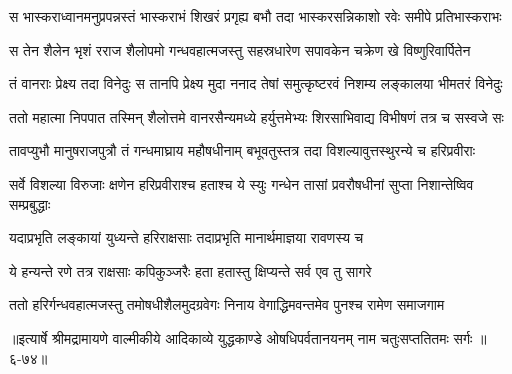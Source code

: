 \twolineshloka
{स भास्कराध्वानमनुप्रपन्नस्तं भास्कराभं शिखरं प्रगृह्य}
{बभौ तदा भास्करसन्निकाशो रवेः समीपे प्रतिभास्कराभः} %

\twolineshloka
{स तेन शैलेन भृशं रराज शैलोपमो गन्धवहात्मजस्तु}
{सहस्रधारेण सपावकेन चक्रेण खे विष्णुरिवार्पितेन} %

\twolineshloka
{तं वानराः प्रेक्ष्य तदा विनेदुः स तानपि प्रेक्ष्य मुदा ननाद}
{तेषां समुत्कृष्टरवं निशम्य लङ्कालया भीमतरं विनेदुः} %

\twolineshloka
{ततो महात्मा निपपात तस्मिन् शैलोत्तमे वानरसैन्यमध्ये}
{हर्युत्तमेभ्यः शिरसाभिवाद्य विभीषणं तत्र च सस्वजे सः} %

\twolineshloka
{तावप्युभौ मानुषराजपुत्रौ तं गन्धमाघ्राय महौषधीनाम्}
{बभूवतुस्तत्र तदा विशल्यावुत्तस्थुरन्ये च हरिप्रवीराः} %

\twolineshloka
{सर्वे विशल्या विरुजाः क्षणेन हरिप्रवीराश्च हताश्च ये स्युः}
{गन्धेन तासां प्रवरौषधीनां सुप्ता निशान्तेष्विव सम्प्रबुद्धाः} %

\twolineshloka
{यदाप्रभृति लङ्कायां युध्यन्ते हरिराक्षसाः}
{तदाप्रभृति मानार्थमाज्ञया रावणस्य च} %

\twolineshloka
{ये हन्यन्ते रणे तत्र राक्षसाः कपिकुञ्जरैः}
{हता हतास्तु क्षिप्यन्ते सर्व एव तु सागरे} %

\twolineshloka
{ततो हरिर्गन्धवहात्मजस्तु तमोषधीशैलमुदग्रवेगः}
{निनाय वेगाद्धिमवन्तमेव पुनश्च रामेण समाजगाम} %


॥इत्यार्षे श्रीमद्रामायणे वाल्मीकीये आदिकाव्ये युद्धकाण्डे ओषधिपर्वतानयनम् नाम चतुःसप्ततितमः सर्गः ॥६-७४॥
